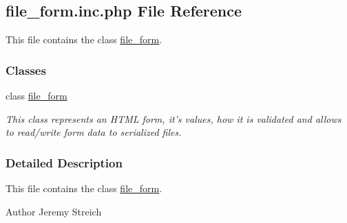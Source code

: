 \hypertarget{file__form_8inc_8php}{\subsection{file\-\_\-form.\-inc.\-php File Reference}
\label{file__form_8inc_8php}
}


This file contains the class \hyperlink{classfile__form}{file\-\_\-form}.  


\subsubsection*{Classes}
\begin{DoxyCompactItemize}
\item 
class \hyperlink{classfile__form}{file\-\_\-form}
\begin{DoxyCompactList}\small\item\em This class represents an H\-T\-M\-L form, it's values, how it is validated and allows to read/write form data to serialized files. \end{DoxyCompactList}\end{DoxyCompactItemize}


\subsubsection{Detailed Description}
This file contains the class \hyperlink{classfile__form}{file\-\_\-form}. \begin{DoxyAuthor}{Author}
Jeremy Streich 
\end{DoxyAuthor}
